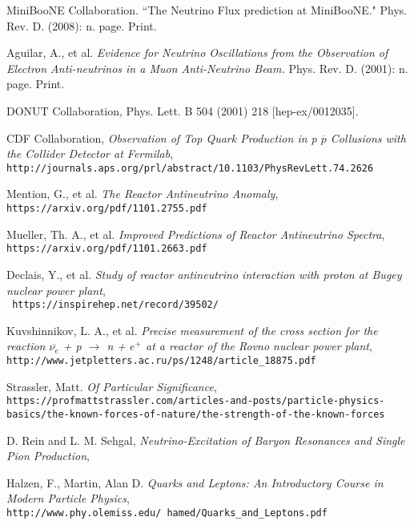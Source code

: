 \documentclass[12pt]{article}
\begin{document}
\begin{thebibliography}{20}
MiniBooNE Collaboration. ``The Neutrino Flux prediction at MiniBooNE." Phys. Rev. D. (2008): n. page. Print.

Aguilar, A., et al. \emph{Evidence for Neutrino Oscillations from the Observation of Electron Anti-neutrinos in a Muon Anti-Neutrino Beam.} Phys. Rev. D. (2001): n. page. Print.

DONUT Collaboration, Phys. Lett. B 504 (2001) 218 [hep-ex/0012035].

CDF Collaboration, \emph{Observation of Top Quark Production in p $\overline{p}$ Collusions with the Collider Detector at Fermilab},\\
  \texttt{http://journals.aps.org/prl/abstract/10.1103/PhysRevLett.74.2626}

Mention, G., et al. \emph{The Reactor Antineutrino Anomaly},\\
  \texttt{https://arxiv.org/pdf/1101.2755.pdf}


Mueller, Th. A., et al. \emph{Improved Predictions of Reactor Antineutrino Spectra},\\
  \texttt{https://arxiv.org/pdf/1101.2663.pdf}

Declais, Y., et al. \emph{Study of reactor antineutrino interaction with proton at Bugey nuclear power plant},\\
  \texttt{ https://inspirehep.net/record/39502/}

Kuvshinnikov, L. A., et al. \emph{Precise measurement of the cross section for the reaction $\overline{\nu_e}$ + p $\rightarrow$ n + $e^+$ at a reactor of the Rovno nuclear power plant},\\
  \texttt{http://www.jetpletters.ac.ru/ps/1248/article\_18875.pdf}




Strassler, Matt. \emph{Of Particular Significance},\\
  \texttt{https://profmattstrassler.com/articles-and-posts/particle-physics-basics/the-known-forces-of-nature/the-strength-of-the-known-forces}

D. Rein and L. M. Sehgal, \emph{Neutrino-Excitation of Baryon Resonances and Single Pion Production},\\

Halzen, F., Martin, Alan D. \emph{Quarks and Leptons: An Introductory Course in Modern Particle Physics},\\
  \texttt{http://www.phy.olemiss.edu/~hamed/Quarks\_and\_Leptons.pdf}


\end{thebibliography}
\end{document}
